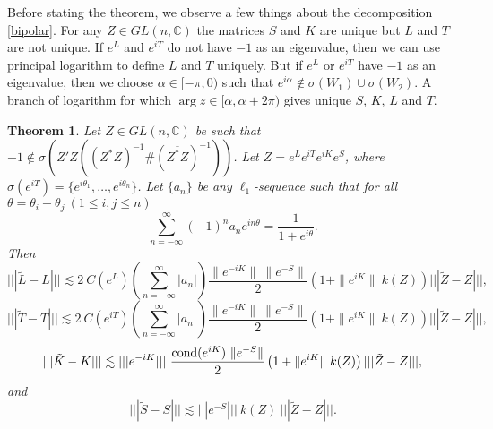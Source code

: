 \documentclass[12pt,epsfig,reqno]{amsart}
\newtheorem{thm}{Theorem}
\theoremstyle{remark}
\begin{document}
Before stating the theorem, we observe a few things about the decomposition \eqref{bipolar}. For any $Z\in GL(n,\mathbb C)$ the matrices $S$ and  $K$ are unique but $L$ and $T$ are not unique.
If $e^L$ and $e^{iT}$ do not have $-1$ as an eigenvalue, then we can use principal logarithm to define $L$ and $T$ uniquely.  But if $e^L$ or $e^{iT}$ have $-1$ as an eigenvalue, then we choose  $\alpha\in [-\pi, 0)$ such that $e^{i\alpha}\notin \sigma(W_1)\cup \sigma(W_2)$.  A branch of logarithm for which $\arg z\in [\alpha, \alpha+2\pi)$ gives unique $S$, $K$, $L$ and $T$.




\begin{thm}\label{main}
Let $Z\in GL(n,\mathbb C)$ be such that $-1\notin \sigma(Z'Z ((Z^*Z)^{-1}\# (\overline{Z^*Z})^{-1}))$. Let $Z=e^L e^{iT} e^{iK} e^S$, where $\sigma(e^{iT})=\{e^{i\theta_1},\ldots,e^{i\theta_n}\}$. Let $\{a_n\}$ be any $\ell_1$-sequence such that for all $\theta= \theta_i-\theta_j \ (1\leq i,j\leq n)$ \begin{equation*}\sum_{n=-\infty}^\infty (-1)^n a_n e^{in\theta}= \frac{1}{1+e^{i\theta}}.\end{equation*}Then
\begin{equation}
|||\tilde L-L|||\lesssim 2\ C({e^L})\left(\sum_{n=-\infty}^{\infty} |a_n|\right)\frac{\|e^{-iK}\| \ \|e^{-S}\|}{2 } \left( 1+ \|e^{i K}\|\ k (Z)\right) |||\tilde Z-Z|||,\label{bound for L}
\end{equation}
\begin{equation}
|||\tilde{T}-T|||\lesssim 2\ C({e^{iT}})\left(\sum_{n=-\infty}^{\infty} |a_n|\right)\frac{\|e^{-iK}\| \ \|e^{-S}\|}{2 } \left( 1+ \|e^{i K}\|\ k (Z)\right) |||\tilde Z-Z|||,\label{bound for T}
\end{equation}
\begin{equation}
|||\tilde{K}-K|||\lesssim|||e^{-iK}|||\ \frac{\text{\rm cond} (e^{iK}) \ \|e^{-S}\| }{2 } \left(1+\|e^{iK}\|\ k(Z) \right) |||\tilde Z-Z|||,\label{bound for K}
\end{equation}
and
\begin{equation}
|||\tilde{S}-S|||\lesssim|||e^{-S}|||\ k(Z)\ |||\tilde Z-Z||| \label{bound for S}.
\end{equation}
\end{thm}
\end{document}
